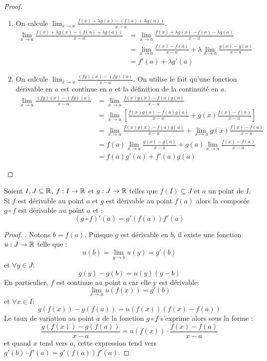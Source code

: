 \begin{proof}
	\leavevmode
	\begin{enumerate}
		\item On calcule $\lim_{x \to a} \frac{f(x) + \lambda g(x) - (f(a) + \lambda g(a))}{x - a}$.
		\begin{align*}
			\lim_{x \to a} \frac{f(x) + \lambda g(x) - (f(a) + \lambda g(a))}{x - a} &= \lim_{x \to a} \frac{f(x) + \lambda g(x) - f(a) - \lambda g(a)}{x - a} \\
			&= \lim_{x \to a} \frac{f(x) - f(a)}{x - a} + \lambda \lim_{x \to a} \frac{g(x) - g(a)}{x - a} \\
			&= f'(a) + \lambda g'(a)
		\end{align*}
		\item On calcule $\lim_{x \to a} \frac{(fg)(x) - (fg)(a)}{x - a}$. On utilise le fait qu'une fonction dérivable en $a$ est continue en $a$ et la définition de la continuité en $a$.
		\begin{align*}
			\lim_{x \to a} \frac{(fg)(x) - (fg)(a)}{x - a} &= \lim_{x \to a} \frac{f(x) g(x) - f(a) g(a)}{x - a} \\
			&= \lim_{x \to a} \left[ \frac{f(x) g(x) - f(a) g(a)}{x - a} + g(x) \frac{f(x) - f(a)}{x - a} \right] \\
			&= \lim_{x \to a} \frac{f(x)g(x) - f(a)g(a)}{x - a} + \lim_{x \to a} g(x) \frac{f(x) - f(a)}{x - a} \\
			&= f(a) \lim_{x \to a} \frac{g(x) - g(a)}{x - a} + g(a) \lim_{x \to a} \frac{f(x) - f(a)}{x - a} \\
			&= f(a) g'(a) + f'(a) g(a)
		\end{align*}
	\end{enumerate}
\end{proof}

\begin{theorem}
	Soient $I, J \subseteq \mathbb{R}$, $f : I \to \mathbb{R}$ et $g : J \to \mathbb{R}$ telles que $f(I) \subseteq J$ et $a$ un point de $I$. \\
	Si $f$ est dérivable au point $a$ et $g$ est dérivable au point $f(a)$ alors la composée $g \circ f$ est dérivable au point $a$ et :
	\[ (g \circ f)'(a) = g'(f(a)) f'(a) \]
\end{theorem}

\begin{proof}
	\cite{derivation_wikiversite}. Notons $b = f(a)$. Puisque $g$ est dérivable en $b$, il existe une fonction $u : J \to \mathbb{R}$ telle que :
	\[ u(b) = \lim_{y \to b} u(y) = g'(b) \]
	et $\forall y \in J :$ 
	\[ g(y) - g(b) = u(y) (y - b) \]
	En particulier, $f$ est continue au point $a$ car elle y est dérivable: 
	\[ \lim_{x \to a} u(f(x)) = g'(b) \]
	et $\forall x \in I :$
	\[ g(f(x)) - g(f(a)) = u(f(x)) (f(x) - f(a)) \]
	Le taux de variation au point $a$ de la fonction $g \circ f$ s'exprime alors sous la forme :
	\[ \frac{g(f(x)) - g(f(a))}{x - a} = u(f(x)) \cdot \frac{f(x) - f(a)}{x - a} \]
	et quand $x$ tend vers $a$, cette expression tend vers $g'(b) \cdot f'(a) = g'(f(a)) f'(a)$.
\end{proof}


